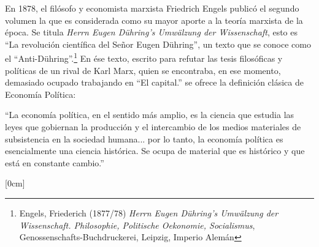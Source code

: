 En 1878, el filósofo y economista marxista Friedrich Engels publicó el segundo volumen la que es considerada como su mayor aporte a la teoría marxista de la época. Se titula \textit{Herrn Eugen Dühring's Umwälzung der Wissenschaft}, esto es ``La revolución científica del Señor Eugen Dühring'', un texto que se conoce como el ``Anti-Dühring''.\footnote{Engels, Friederich (1877/78) \textit{Herrn Eugen Dühring's Umwälzung der Wissenschaft. Philosophie, Politische Oekonomie, Socialismus}, Genossenschafts-Buchdruckerei, Leipzig, Imperio Alemán} En ése texto, escrito para refutar las tesis filosóficas y políticas de un rival de Karl Marx, quien se encontraba, en ese momento, demasiado ocupado trabajando en ``El capital.'' se ofrece la definición clásica de Economía Política: \\

\hfill\begin{minipage}{\dimexpr\textwidth-2cm}
``La economía política, en el sentido más amplio, es la ciencia que estudia las leyes que gobiernan la producción y el intercambio de los medios materiales de subsistencia en la sociedad humana... por lo tanto, la economía política es esencialmente una ciencia histórica. Se ocupa de material que es histórico y que está en constante cambio.''
\end{minipage}

[0cm] %